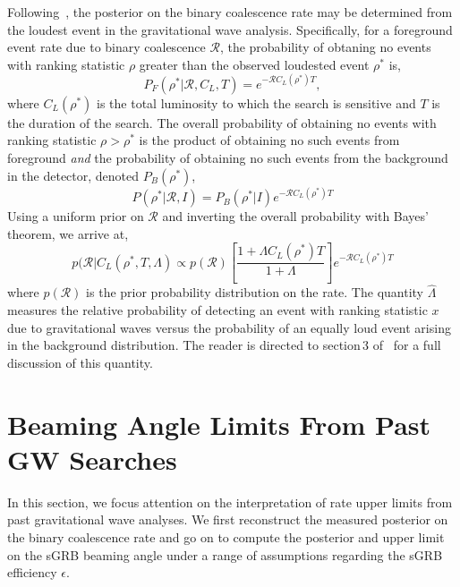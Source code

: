 \documentclass[twocolumn,nofootinbib]{revtex4}
\newcommand{\gw}{gravitational wave }
\newcommand{\gws}{gravitational waves }
\newcommand{\cbcrate}{{{\mathcal R}}}
\newcommand{\rhostar}{{\rho^*}}
\begin{document}
Following~\cite{Biswas09,BradyFairhurst08}, the posterior on the binary
coalescence rate may be determined from the loudest event in the \gw
analysis.  Specifically, for a foreground event rate due to  binary coalescence
$\cbcrate$, the probability of obtaning no events with ranking statistic $\rho$
greater than the observed loudested event $\rhostar$ is,
%
\begin{equation}
P_F(\rhostar | \cbcrate, C_L, T) = e^{-\cbcrate C_L(\rhostar) T},
\end{equation}
%
where $C_L(\rhostar)$ is the total luminosity to which the search is sensitive
and $T$ is the duration of the search.  The overall probability of obtaining
no events with ranking statistic $\rho>\rhostar$ is the product of obtaining
no such events from foreground \emph{and} the probability of obtaining no such
events from the background in the detector, denoted $P_B(\rhostar)$,
%
\begin{equation}
P(\rhostar|\cbcrate,I) = P_B(\rhostar|I)e^{-\cbcrate C_L(\rhostar) T}
\end{equation}
%
Using a uniform prior on $\cbcrate$ and inverting the overall probability with
Bayes' theorem, we arrive at,
%
\begin{equation}\label{eq:loudestEventPosterior}
p(\cbcrate | C_L({\rhostar}, T, \Lambda) \propto p(\cbcrate) \left[ \frac{1+\Lambda
C_L(\rhostar) T}{1+\Lambda}\right] e^{-\cbcrate C_L(\rhostar) T}
\end{equation}
%
where $p(\cbcrate)$ is the prior probability distribution on the rate.  The
quantity $\hat{\Lambda}$ measures the relative probability of detecting an event
with ranking statistic $x$ due to \gws versus the probability of an equally loud
event arising in the background distribution.  The reader is directed to
section\,3 of~\cite{BradyFairhurst08} for a full discussion of this quantity.

%

\section{Beaming Angle Limits From Past GW Searches}

In this section, we focus attention on the interpretation of rate upper limits
from past \gw analyses.  We first reconstruct the measured posterior on the
binary coalescence rate and go on to compute the posterior and upper limit on
the sGRB beaming angle under a range of assumptions regarding the sGRB
efficiency $\epsilon$.
\end{document}
